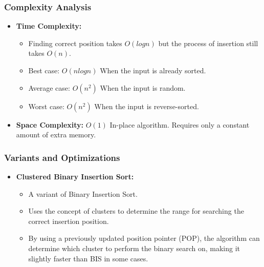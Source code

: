     \subsubsection{Complexity Analysis}
        \begin{itemize}
            \item \textbf{Time Complexity:}
            \begin{itemize}
                \item Finding correct position takes $O(logn)$ but the process of insertion still takes $O(n)$.
                \item Best case: $O(nlogn)$
                    \subitem When the input is already sorted.
                \item Average case: $O(n^2)$
                    \subitem When the input is random.
                \item Worst case: $O(n^2)$ 
                    \subitem When the input is reverse-sorted.
            \end{itemize}
            \item \textbf{Space Complexity:} $O(1)$ 
                \subitem In-place algorithm. Requires only a constant amount of extra memory.
        \end{itemize}
        
    \subsubsection{Variants and Optimizations}
        \begin{itemize}
            \item \textbf{Clustered Binary Insertion Sort:\cite{goel2018cbis}}
            \begin{itemize}
                \item A variant of Binary Insertion Sort.
                \item Uses the concept of clusters to determine the range for searching the correct insertion position.
                \item By using a previously updated position pointer (POP), the algorithm can determine which cluster to perform the binary search on, making it slightly faster than BIS in some cases.
            \end{itemize}
        \end{itemize}